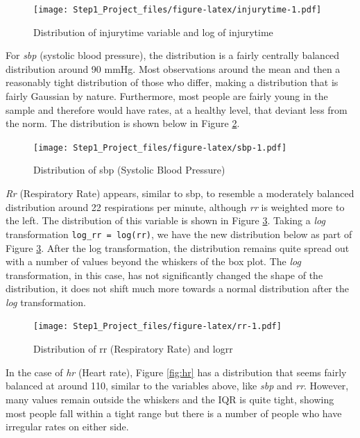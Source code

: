 \documentclass[
]{article}
\begin{document}
\begin{figure}
\centering
\texttt{[image: Step1\_Project\_files/figure-latex/injurytime-1.pdf]}
\caption{Distribution of injurytime variable and log of
injurytime\label{fig:injurytime}}
\end{figure}

For \emph{sbp} (systolic blood pressure), the distribution is a fairly
centrally balanced distribution around 90 mmHg. Most observations around
the mean and then a reasonably tight distribution of those who differ,
making a distribution that is fairly Gaussian by nature. Furthermore,
most people are fairly young in the sample and therefore would have
rates, at a healthy level, that deviant less from the norm. The
distribution is shown below in Figure \ref{fig:sbp}.

\begin{figure}
\centering
\texttt{[image: Step1\_Project\_files/figure-latex/sbp-1.pdf]}
\caption{Distribution of sbp (Systolic Blood Pressure)\label{fig:sbp}}
\end{figure}

\newpage

\emph{Rr} (Respiratory Rate) appears, similar to sbp, to resemble a
moderately balanced distribution around 22 respirations per minute,
although \emph{rr} is weighted more to the left. The distribution of
this variable is shown in Figure \ref{fig:rr}. Taking a \emph{log}
transformation \texttt{log\_rr\ =\ log(rr)}, we have the new
distribution below as part of Figure \ref{fig:rr}. After the log
transformation, the distribution remains quite spread out with a number
of values beyond the whiskers of the box plot. The \emph{log}
transformation, in this case, has not significantly changed the shape of
the distribution, it does not shift much more towards a normal
distribution after the \emph{log} transformation.

\begin{figure}
\centering
\texttt{[image: Step1\_Project\_files/figure-latex/rr-1.pdf]}
\caption{Distribution of rr (Respiratory Rate) and logrr\label{fig:rr}}
\end{figure}

In the case of \emph{hr} (Heart rate), Figure \ref{fig:hr} has a
distribution that seems fairly balanced at around 110, similar to the
variables above, like \emph{sbp} and \emph{rr}. However, many values
remain outside the whiskers and the IQR is quite tight, showing most
people fall within a tight range but there is a number of people who
have irregular rates on either side.
\end{document}
